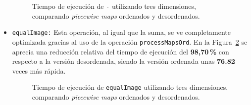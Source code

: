 \begin{itemize}
   \begin{figure}[htbp]
          \centering
          \caption{Tiempo de ejecución de \texttt{-} utilizando tres dimensiones, comparando \textit{piecewise maps} ordenados y desordenados.}
          \label{fig:Ren-resta-3d}
        \end{figure}
    \item \texttt{equalImage:} 
        Esta operación, al igual que la suma, se ve completamente optimizada gracias 
        al uso de la operación \texttt{processMapsOrd}. En la Figura~\ref{fig:Ren-equal-3d} 
        se aprecia una reducción relativa del tiempo de ejecución del \textbf{98{,}70\,\%} 
        con respecto a la versión desordenada, siendo la versión ordenada unas 
        \textbf{76.82} veces más rápida.



   \begin{figure}[htbp]
          \centering
          \caption{Tiempo de ejecución de \texttt{equalImage} utilizando tres dimensiones, comparando \textit{piecewise maps} ordenados y desordenados.}
          \label{fig:Ren-equal-3d}
        \end{figure}


\end{itemize}
